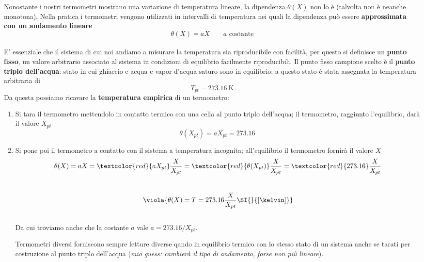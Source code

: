 Nonostante i nostri termometri mostrano una variazione di temperatura lineare, la dipendenza \(\theta(X)\) non lo è (talvolta non è neanche monotona). Nella pratica i termometri vengono utilizzati in intervalli di temperatura nei quali la dipendenza può essere \textbf{approssimata con un andamento lineare} \\
\[\theta(X) = aX \qquad a \text{ costante}\]\\
E' essenziale che il sistema di cui noi andiamo a misurare la temperatura sia riproducibile con facilità, per questo si definisce un \textbf{punto fisso}, un valore arbitrario associato al sistema in condizioni di equilibrio facilmente riproducibili. Il punto fisso campione scelto è il \textbf{punto triplo dell'acqua}: stato in cui ghiaccio e acqua e vapor d'acqua saturo sono in equilibrio; a questo stato è stata assegnata la temperatura arbitraria di 
\[ 
T_{pt} = \SI{273.16}{\kelvin}
\]
Da questa possiamo ricavare la \textbf{temperatura empirica} di un termometro:
\begin{enumerate}
	\item Si tara il termometro mettendolo in contatto termico con una cella al punto triplo dell'acqua; il termometro, raggiunto l'equilibrio, darà il valore \(X_{pt}\)
	\[ 
	\theta(X_{pt}) = aX_{pt} =  \SI{273.16}{}
	\]
	\item Si pone poi il termometro a contatto con il sistema a temperatura incognita; all'equilibrio il termometro fornirà il valore \(X\)
	\[ 
	\theta(X) = aX = \textcolor{red}{aX_{pt}}\frac{X}{X_{pt}} = \textcolor{red}{\theta(X_{pt})}\frac{X}{X_{pt}} = \textcolor{red}{273.16}\frac{X}{X_{pt}} 
	\]\\
	\begin{equation}\label{temperatura punto triplo}
		\viola{\theta(X) = T  = 273.16\frac{X}{X_{pt}} \SI{ }{[\kelvin]} }
	\end{equation}
	\\
	
	\noindent
	Da cui troviamo anche che la costante \(a\) vale \(a = 273.16/X_{pt}\).
	
	Termometri diversi forniscono sempre letture diverse qando in equilibrio termico con lo stesso stato di un sistema anche se tarati per costruzione al punto triplo dell'acqua (\textit{mio guess: cambierà il tipo di andamento, forse non più lineare}).
	
\end{enumerate}
